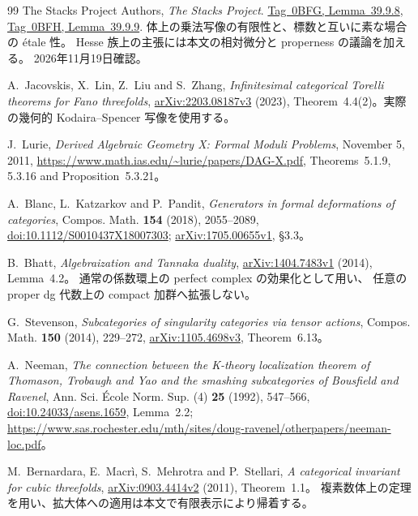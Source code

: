 \documentclass[11pt,a4paper]{ltjsarticle}
\numberwithin{equation}{section}
\begin{document}
\begin{thebibliography}{99}
The Stacks Project Authors, \emph{The Stacks Project}.
\href{https://stacks.math.columbia.edu/tag/0BFG}{Tag~0BFG, Lemma~39.9.8},
\href{https://stacks.math.columbia.edu/tag/0BFH}{Tag~0BFH, Lemma~39.9.9}.
体上の乗法写像の有限性と、標数と互いに素な場合の \'etale 性。
Hesse 族上の主張には本文の相対微分と properness の議論を加える。
2026年11月19日確認。

A.~Jacovskis, X.~Lin, Z.~Liu and S.~Zhang,
\emph{Infinitesimal categorical Torelli theorems for Fano threefolds},
\href{https://arxiv.org/abs/2203.08187v3}{arXiv:2203.08187v3} (2023),
Theorem~4.4(2)。実際の幾何的 Kodaira--Spencer 写像を使用する。

J.~Lurie, \emph{Derived Algebraic Geometry X: Formal Moduli Problems},
November 5, 2011,
\url{https://www.math.ias.edu/~lurie/papers/DAG-X.pdf},
Theorems~5.1.9, 5.3.16 and Proposition~5.3.21。

A.~Blanc, L.~Katzarkov and P.~Pandit,
\emph{Generators in formal deformations of categories},
Compos. Math. \textbf{154} (2018), 2055--2089,
\href{https://doi.org/10.1112/S0010437X18007303}{doi:10.1112/S0010437X18007303};
\href{https://arxiv.org/abs/1705.00655v1}{arXiv:1705.00655v1}, \S3.3。

B.~Bhatt, \emph{Algebraization and Tannaka duality},
\href{https://arxiv.org/abs/1404.7483v1}{arXiv:1404.7483v1} (2014),
Lemma~4.2。
通常の係数環上の perfect complex の効果化として用い、
任意の proper dg 代数上の compact 加群へ拡張しない。

G.~Stevenson, \emph{Subcategories of singularity categories via tensor actions},
Compos. Math. \textbf{150} (2014), 229--272,
\href{https://arxiv.org/abs/1105.4698v3}{arXiv:1105.4698v3}, Theorem~6.13。

A.~Neeman, \emph{The connection between the K-theory localization theorem of Thomason,
Trobaugh and Yao and the smashing subcategories of Bousfield and Ravenel},
Ann. Sci. \'Ecole Norm. Sup. (4) \textbf{25} (1992), 547--566,
\href{https://doi.org/10.24033/asens.1659}{doi:10.24033/asens.1659}, Lemma~2.2;
\url{https://www.sas.rochester.edu/mth/sites/doug-ravenel/otherpapers/neeman-loc.pdf}。

M.~Bernardara, E.~Macr\`i, S.~Mehrotra and P.~Stellari,
\emph{A categorical invariant for cubic threefolds},
\href{https://arxiv.org/abs/0903.4414v2}{arXiv:0903.4414v2} (2011), Theorem~1.1。
複素数体上の定理を用い、拡大体への適用は本文で有限表示により帰着する。


\end{thebibliography}
\end{document}
